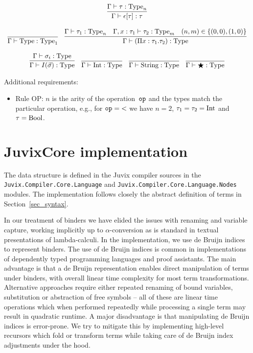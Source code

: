 \documentclass[
    9pt,            %
    techreport,        %
    affiltop,       %
]{art}
\begin{document}
\[\begin{array}{c}
\\ \\
\infer{\Gamma \proves \epsilon[\tau] : \tau}{\Gamma \proves \tau : \Type_n}
\\ \\
\infer{\Gamma \proves \Type : \Type_1}{}\quad
\infer{\Gamma \proves (\Pi x : \tau_1 . \tau_2) : \Type}{\Gamma \proves \tau_1 : \Type_n & \Gamma, x : \tau_1 \proves \tau_2 : \Type_m & (n,m) \in \{(0,0), (1,0)\}}
\\ \\
\infer{\Gamma \proves I(\vec{\sigma}) : \Type}{\Gamma \proves \sigma_i : \Type}\quad
\infer{\Gamma \proves \Int : \Type}{}\quad
\infer{\Gamma \proves \String : \Type}{}\quad
\infer{\Gamma \proves \Dynamic : \Type}{}
\end{array}
\]

Additional requirements:
\begin{itemize}
\item Rule OP: $n$ is the arity of the operation~$\mathtt{op}$ and the types match the particular operation, e.g., for $\mathtt{op} = {<}$ we have $n=2$, $\tau_1=\tau_2=\mathrm{Int}$ and $\tau=\mathrm{Bool}$.
\end{itemize}

\section{JuvixCore implementation}\label{sec_core_implementation}

The \JuvixCore{} data structure is defined in the Juvix compiler sources in the \texttt{Juvix.Compiler.Core.Language} and \texttt{Juvix.Compiler.Core.Language.Nodes} modules. The implementation follows closely the abstract definition of terms in Section~\ref{sec_syntax}.

In our treatment of binders we have elided the issues with renaming and variable capture, working implicitly up to $\alpha$-conversion as is standard in textual presentations of lambda-calculi. In the implementation, we use de Bruijn indices to represent binders. The use of de Bruijn indices is common in implementations of dependently typed programming languages and proof assistants. The main advantage is that a de Bruijn representation enables direct manipulation of terms under binders, with overall linear time complexity for most term transformations. Alternative approaches require either repeated renaming of bound variables, substitution or abstraction of free symbols -- all of these are linear time operations which when performed repeatedly while processing a single term may result in quadratic runtime. A major disadvantage is that manipulating de Bruijn indices is error-prone. We try to mitigate this by implementing high-level recursors which fold or transform \JuvixCore{} terms while taking care of de Bruijn index adjustments under the hood.
\end{document}
